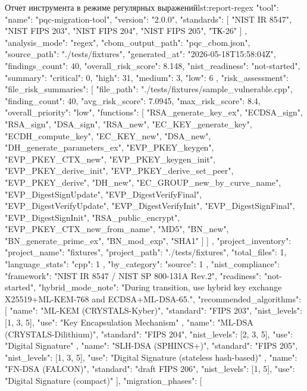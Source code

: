 \documentclass{itmo-vkr}
\begin{document}
\begin{itmolisting}[JSON]{Отчет инструмента в режиме регулярных выражений}{lst:report-regex}
	{
		"tool": {
			"name": "pqc-migration-tool",
			"version": "2.0.0",
			"standards": [
			"NIST IR 8547", "NIST FIPS 203", "NIST FIPS 204",
			"NIST FIPS 205", "ТК-26"
			]
		},
		"analysis_mode": "regex",
		"cbom_output_path": "pqc_cbom.json",
		"source_path": "./tests/fixtures",
		"generated_at": "2026-05-18T15:58:04Z",
		"findings_count": 40,
		"overall_risk_score": 8.148,
		"nist_readiness": "not-started",
		"summary": {
			"critical": 0,
			"high": 31,
			"medium": 3,
			"low": 6
		},
		"risk_assessment": {
			"file_risk_summaries": [
			{
				"file_path": "./tests/fixtures/sample_vulnerable.cpp",
				"finding_count": 40,
				"avg_risk_score": 7.0945,
				"max_risk_score": 8.4,
				"overall_priority": "low",
				"functions": [
				"RSA_generate_key_ex", "ECDSA_sign", "RSA_sign", "DSA_sign",
				"RSA_new", "EC_KEY_generate_key", "ECDH_compute_key",
				"EC_KEY_new", "DSA_new", "DH_generate_parameters_ex",
				"EVP_PKEY_keygen", "EVP_PKEY_CTX_new", "EVP_PKEY_keygen_init",
				"EVP_PKEY_derive_init", "EVP_PKEY_derive_set_peer",
				"EVP_PKEY_derive", "DH_new", "EC_GROUP_new_by_curve_name",
				"EVP_DigestSignUpdate", "EVP_DigestVerifyFinal",
				"EVP_DigestVerifyUpdate", "EVP_DigestVerifyInit",
				"EVP_DigestSignFinal", "EVP_DigestSignInit",
				"RSA_public_encrypt", "EVP_PKEY_CTX_new_from_name",
				"MD5", "BN_new", "BN_generate_prime_ex", "BN_mod_exp", "SHA1"
				]
			}
			]
		},
		"project_inventory": {
			"project_name": "fixtures",
			"project_path": "./tests/fixtures",
			"total_files": 1,
			"language_stats": { "cpp": 1 },
			"by_category": { "source": 1 }
		},
		"nist_compliance": {
			"framework": "NIST IR 8547 / NIST SP 800-131A Rev.2",
			"readiness": "not-started",
			"hybrid_mode_note": "During transition, use hybrid key exchange X25519+ML-KEM-768 and ECDSA+ML-DSA-65.",
			"recommended_algorithms": [
			{
				"name": "ML-KEM (CRYSTALS-Kyber)",
				"standard": "FIPS 203",
				"nist_levels": [1, 3, 5],
				"use": "Key Encapsulation Mechanism"
			},
			{
				"name": "ML-DSA (CRYSTALS-Dilithium)",
				"standard": "FIPS 204",
				"nist_levels": [2, 3, 5],
				"use": "Digital Signature"
			},
			{
				"name": "SLH-DSA (SPHINCS+)",
				"standard": "FIPS 205",
				"nist_levels": [1, 3, 5],
				"use": "Digital Signature (stateless hash-based)"
			},
			{
				"name": "FN-DSA (FALCON)",
				"standard": "draft FIPS 206",
				"nist_levels": [1, 5],
				"use": "Digital Signature (compact)"
			}
			],
			"migration_phases": [
}}
\end{itmolisting}
\end{document}
